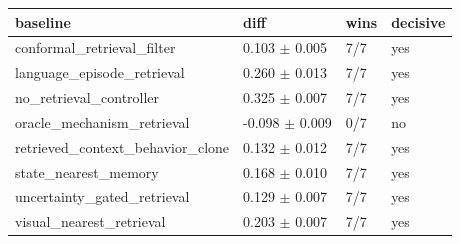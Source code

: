 \begin{tabular}{llll}
\toprule
baseline & diff & wins & decisive \\
\midrule
conformal\_retrieval\_filter & 0.103 $\pm$ 0.005 & 7/7 & yes \\
language\_episode\_retrieval & 0.260 $\pm$ 0.013 & 7/7 & yes \\
no\_retrieval\_controller & 0.325 $\pm$ 0.007 & 7/7 & yes \\
oracle\_mechanism\_retrieval & -0.098 $\pm$ 0.009 & 0/7 & no \\
retrieved\_context\_behavior\_clone & 0.132 $\pm$ 0.012 & 7/7 & yes \\
state\_nearest\_memory & 0.168 $\pm$ 0.010 & 7/7 & yes \\
uncertainty\_gated\_retrieval & 0.129 $\pm$ 0.007 & 7/7 & yes \\
visual\_nearest\_retrieval & 0.203 $\pm$ 0.007 & 7/7 & yes \\
\bottomrule
\end{tabular}
